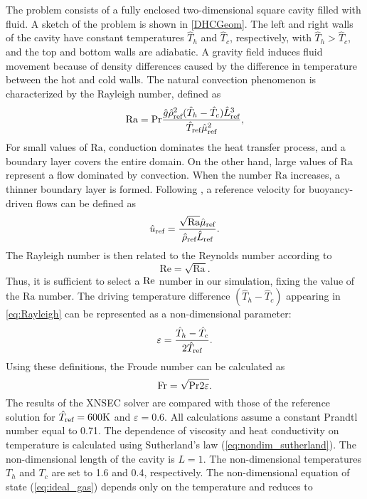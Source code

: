 The problem consists of a fully enclosed two-dimensional square cavity filled with fluid.  A sketch of the problem is shown in \cref{DHCGeom}. The left and right walls of the cavity have constant temperatures $\hat{T}_h$ and $\hat{T}_c$, respectively, with $\hat{T}_h >\hat{T}_c$, and the top and bottom walls are adiabatic. A gravity field induces fluid movement because of density differences caused by the difference in temperature between the hot and cold walls.
The natural convection phenomenon is characterized by the Rayleigh number, defined as
\begin{equation}\label{eq:Rayleigh}
	\text{Ra} = \Prandtl \frac{\hat g \RefVal{\rho}^2(\hat T_h-\hat T_c) \RefVal{L}^3}{\RefVal{T}\RefVal{\mu}^2},
\end{equation}
For small values of $\text{Ra}$, conduction dominates the heat transfer process, and a boundary layer covers the entire domain. On the other hand, large values of $\text{Ra}$ represent a flow dominated by convection. When the number $\text{Ra}$ increases, a thinner boundary layer is formed.
Following \cite{vierendeelsBenchmarkSolutionsNatural2003}, a reference velocity for buoyancy-driven flows can be defined as
\begin{equation}
	\RefVal{u} = \frac{\sqrt{\text{Ra}} \RefVal{\mu}}{\RefVal{\rho}\RefVal{L}}.
\end{equation}
The Rayleigh number is then related to the Reynolds number according to
\begin{equation}
	\text{Re} = \sqrt{\text{Ra}}.
\end{equation}
Thus, it is sufficient to select a $\Reynolds$ number in our simulation, fixing the value of the $\text{Ra}$ number. The driving temperature difference $(\hat T_h - \hat T_c)$ appearing in \cref{eq:Rayleigh} can be represented as a non-dimensional parameter:
\begin{equation}\label{eq:nondimensionalTemperature}
	\varepsilon = \frac{\hat T_h - \hat T_c}{2\RefVal{T}}.
\end{equation}
Using these definitions, the Froude number can be calculated as
\begin{equation}
	\Froude = \sqrt{\Prandtl 2 \varepsilon}.
\end{equation}
The results of the XNSEC solver are compared with those of the reference solution for $\RefVal{T} = 600\si{K}$  and $\varepsilon = 0.6$. All calculations assume a constant Prandtl number equal to 0.71. The dependence of viscosity and heat conductivity on temperature is calculated using Sutherland's law (\cref{eq:nondim_sutherland}). The non-dimensional length of the cavity is $L=1$. The non-dimensional temperatures $T_h$ and $T_c$ are set to 1.6 and 0.4, respectively. The non-dimensional equation of state (\cref{eq:ideal_gas}) depends only on the temperature and reduces to
